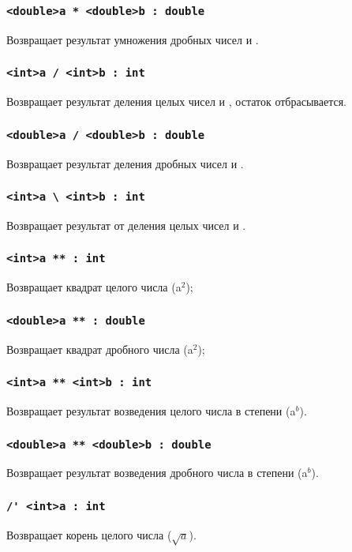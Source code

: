 \documentclass[a4paper, 14pt]{extarticle}
\begin{document}
\subsubsection{\lstinline`<double>a * <double>b : double`}
Возвращает результат умножения дробных чисел  и .

\subsubsection{\lstinline`<int>a / <int>b : int`}
Возвращает результат деления целых чисел  и , остаток отбрасывается.

\subsubsection{\lstinline`<double>a / <double>b : double`}
Возвращает результат деления дробных чисел  и .

\subsubsection{\lstinline`<int>a \ <int>b : int`}
Возвращает результат от деления целых чисел  и .


\subsubsection{\lstinline`<int>a ** : int`}
Возвращает квадрат целого числа  (a$^2$);

\subsubsection{\lstinline`<double>a ** : double`}
Возвращает квадрат дробного числа  (a$^2$);

\subsubsection{\lstinline`<int>a ** <int>b : int`}
Возвращает результат возведения целого числа  в степени  (a$^b$).

\subsubsection{\lstinline`<double>a ** <double>b : double`}
Возвращает результат возведения дробного числа  в степени  (a$^b$).

\subsubsection{\lstinline`/' <int>a : int`}
Возвращает корень целого числа  ($\sqrt{a}$).
\end{document}

